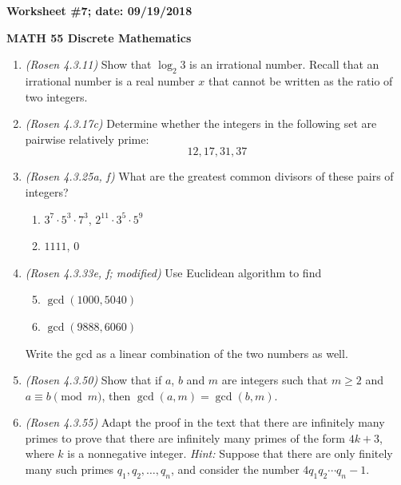 \documentclass{article}
\begin{document}
{\bf Worksheet \#7; date: 09/19/2018}

{\bf MATH 55 Discrete Mathematics}

\begin{enumerate}
\item {\em (Rosen 4.3.11)} Show that $\log_2 3$ is an irrational number. Recall that an irrational number is a real number $x$ that cannot be written as the ratio of two integers.

\item {\em (Rosen 4.3.17c)} Determine whether the integers in the following set are pairwise relatively prime:
\[
12, 17, 31, 37
\]

\item {\em (Rosen 4.3.25a, f)} What are the greatest common divisors of these pairs of integers?
\begin{enumerate}
\item $3^7 \cdot 5^3 \cdot 7^3$, $2^{11} \cdot 3^5 \cdot 5^9$
\setcounter{enumii}{5}
\item $1111$, $0$
\end{enumerate}

\item {\em (Rosen 4.3.33e, f; modified)} Use Euclidean algorithm to find
\begin{enumerate}
\setcounter{enumii}{4}
\item $\gcd(1000, 5040)$
\item $\gcd(9888, 6060)$
\end{enumerate}
Write the gcd as a linear combination of the two numbers as well.

\item {\em (Rosen 4.3.50)} Show that if $a$, $b$ and $m$ are integers such that $m \ge 2$ and $a \equiv b \pmod{m}$, then $\gcd(a, m) = \gcd(b, m)$.

\item {\em (Rosen 4.3.55)} Adapt the proof in the text that there are infinitely many primes to prove that there are infinitely many primes of the form $4k+3$, where $k$ is a nonnegative integer. {\em Hint:} Suppose that there are only finitely many such primes $q_1, q_2, \ldots, q_n$, and consider the number $4q_1 q_2 \cdots q_n - 1$.
\end{enumerate}
\end{document}
